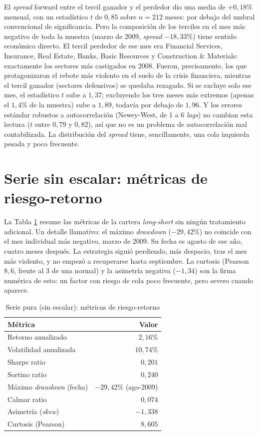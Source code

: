 \documentclass[12pt]{report} %
\begin{document}
El \textit{spread} forward entre el tercil ganador y el perdedor dio una media de $+0{,}18\%$ mensual, con un estadístico $t$ de $0{,}85$ sobre $n=212$ meses: por debajo del umbral convencional de significancia. Pero la composición de los terciles en el mes más negativo de toda la muestra (marzo de 2009, \textit{spread} $-18{,}33\%$) tiene sentido económico directo. El tercil perdedor de ese mes era Financial Services, Insurance, Real Estate, Banks, Basic Resources y Construction \& Materials: exactamente los sectores más castigados en 2008. Fueron, precisamente, los que protagonizaron el rebote más violento en el suelo de la crisis financiera, mientras el tercil ganador (sectores defensivos) se quedaba rezagado. Si se excluye solo ese mes, el estadístico $t$ sube a $1{,}37$; excluyendo los tres meses más extremos (apenas el $1{,}4\%$ de la muestra) sube a $1{,}89$, todavía por debajo de $1{,}96$. Y los errores estándar robustos a autocorrelación (Newey-West, de 1 a 6 \textit{lags}) no cambian esta lectura ($t$ entre $0{,}79$ y $0{,}82$), así que no es un problema de autocorrelación mal contabilizada. La distribución del \textit{spread} tiene, sencillamente, una cola izquierda pesada y poco frecuente.

\section{Serie sin escalar: métricas de riesgo-retorno}

La Tabla \ref{tab:pura-bruta} resume las métricas de la cartera \textit{long-short} sin ningún tratamiento adicional. Un detalle llamativo: el máximo \textit{drawdown} ($-29{,}42\%$) no coincide con el mes individual más negativo, marzo de 2009. Su fecha es agosto de ese año, cuatro meses después. La estrategia siguió perdiendo, más despacio, tras el mes más violento, y no empezó a recuperarse hasta septiembre. La curtosis (Pearson $8{,}6$, frente al $3$ de una normal) y la asimetría negativa ($-1{,}34$) son la firma numérica de esto: un factor con riesgo de cola poco frecuente, pero severo cuando aparece.

\begin{table}[H]
\centering
\caption{Serie pura (sin escalar): métricas de riesgo-retorno}
\label{tab:pura-bruta}
\begin{tabular}{|l|r|}
\hline
\textbf{Métrica} & \textbf{Valor} \\
\hline
Retorno anualizado & $2{,}16\%$ \\
Volatilidad anualizada & $10{,}74\%$ \\
Sharpe ratio & $0{,}201$ \\
Sortino ratio & $0{,}240$ \\
Máximo \textit{drawdown} (fecha) & $-29{,}42\%$ (ago-2009) \\
Calmar ratio & $0{,}074$ \\
Asimetría (\textit{skew}) & $-1{,}338$ \\
Curtosis (Pearson) & $8{,}605$ \\
\hline
\end{tabular}
\end{table}
\end{document}
